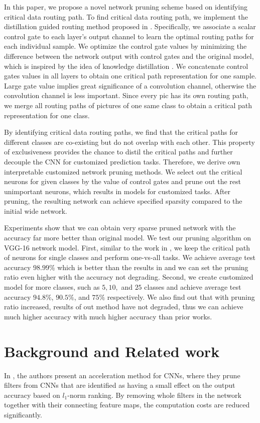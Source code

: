 \documentclass[conference]{IEEEtran}
\begin{document}
In this paper, we propose a novel network pruning scheme based on identifying critical data routing path. To find critical data routing path, we implement the distillation guided routing method proposed in \cite{Wang_2018_CVPR}. Specifically, we associate a scalar control gate to each layer’s output channel to learn the optimal routing
paths for each individual sample. We optimize the control gate values by minimizing the difference between the network output with control gates and the original model, which is inspired by the idea of knowledge distillation \cite{hinton2015distilling}. We concatenate control gates values in all layers to obtain one critical path
representation for one sample. Large gate value implies great significance of a convolution channel, otherwise the convolution channel is less important. Since every pic has its own routing path,
we merge all routing paths of pictures of one same class to obtain a critical path representation for one class.

By identifying critical data routing paths, we find that the critical paths for different classes are co-existing but do not overlap with each other. This property of exclusiveness provides the chance to distil the critical paths and further decouple the CNN for customized prediction tasks. Therefore, we derive own interpretable customized network pruning methods. We select out the critical neurons for given classes by the value of control gates and prune out the rest unimportant neurons, which results in models for customized tasks. After pruning, the resulting network can achieve specified sparsity compared to the initial wide network.

Experiments show that we can obtain very sparse pruned network with the accuracy far more better than original model. We test our pruning algorithm on VGG-16 network model. First, similar to the work in \cite{yu2018distilling}, we keep the critical path of neurons for single classes and perform one-vs-all tasks. We achieve average test accuracy $98.99\%$ which is better than the results in \cite{yu2018distilling} and we can set the pruning ratio even higher with the accuracy not degrading. Second, we create customized model for more classes, such as $5, 10, $ and $25$ classes and achieve average test accuracy $94.8\%$, $90.5\%$, and $75\%$ respectively. We also find out that with pruning ratio increased, results of out method have not degraded, thus we can achieve much higher accuracy with much higher accuracy than prior works.

\section{Background and Related work}
In \cite{CNNaccelerationICLR2017}, the authors present an acceleration method for CNNs, where they prune filters from CNNs that are identified as having a small effect on the output accuracy based on $l_1$-norm ranking. By removing whole filters in the network together with their connecting feature maps, the computation costs are reduced significantly.
\end{document}
